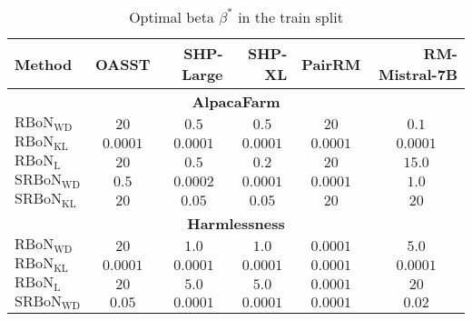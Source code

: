 \begin{table}[tb]
\centering

\caption{Optimal beta $\beta^*$ in the train split}
\small
\begin{tabular}{@{}lrrrrr@{}}
\toprule
\rowcolor[HTML]{EFEFEF} 
 Method & \textbf{OASST} & \textbf{SHP-Large} & \textbf{SHP-XL} & \textbf{PairRM}  & \textbf{RM-Mistral-7B} \\ \midrule

\multicolumn{6}{c}{\textbf{AlpacaFarm}} \\ \midrule
\textbf{$\mathrm{RBoN}_{\mathrm{WD}}$} & \multicolumn{1}{c}{$20$} & \multicolumn{1}{c}{$0.5$} & \multicolumn{1}{c}{$0.5$} & \multicolumn{1}{c}{$20$} & \multicolumn{1}{c}{$0.1$} \\
\textbf{$\mathrm{RBoN}_{\mathrm{KL}}$ } & \multicolumn{1}{c}{$0.0001$} & \multicolumn{1}{c}{$0.0001$} & \multicolumn{1}{c}{$0.0001$} & \multicolumn{1}{c}{$0.0001$} & \multicolumn{1}{c}{$0.0001$} \\
\textbf{$\mathrm{RBoN}_{\mathrm{L}}$} & \multicolumn{1}{c}{$20$} & \multicolumn{1}{c}{$0.5$} & \multicolumn{1}{c}{$0.2$} & \multicolumn{1}{c}{$20$} & \multicolumn{1}{c}{$15.0$} \\
\textbf{$\mathrm{SRBoN}_{\mathrm{WD}}$} & \multicolumn{1}{c}{$0.5$} & \multicolumn{1}{c}{$0.0002$} & \multicolumn{1}{c}{$0.0001$} & \multicolumn{1}{c}{$0.0001$} & \multicolumn{1}{c}{$1.0$} \\
\textbf{$\mathrm{SRBoN}_{\mathrm{KL}}$} & \multicolumn{1}{c}{$20$} & \multicolumn{1}{c}{$0.05$} & \multicolumn{1}{c}{$0.05$} & \multicolumn{1}{c}{$20$} & \multicolumn{1}{c}{$20$} \\
\midrule
\multicolumn{6}{c}{\textbf{Harmlessness}} \\ \midrule
\textbf{$\mathrm{RBoN}_{\mathrm{WD}}$} & \multicolumn{1}{c}{$20$} & \multicolumn{1}{c}{$1.0$} & \multicolumn{1}{c}{$1.0$} & \multicolumn{1}{c}{$0.0001$} & \multicolumn{1}{c}{$5.0$} \\
\textbf{$\mathrm{RBoN}_{\mathrm{KL}}$ } & \multicolumn{1}{c}{$ 0.0001$} & \multicolumn{1}{c}{$ 0.0001$} & \multicolumn{1}{c}{$ 0.0001$} & \multicolumn{1}{c}{$ 0.0001$} & \multicolumn{1}{c}{$ 0.0001$} \\
\textbf{$\mathrm{RBoN}_{\mathrm{L}}$} & \multicolumn{1}{c}{$20$} & \multicolumn{1}{c}{$5.0$} & \multicolumn{1}{c}{$5.0$} & \multicolumn{1}{c}{$0.0001$} & \multicolumn{1}{c}{$20$} \\
\textbf{$\mathrm{SRBoN}_{\mathrm{WD}}$} & \multicolumn{1}{c}{$0.05$} & \multicolumn{1}{c}{$0.0001$} & \multicolumn{1}{c}{ $0.0001$} & \multicolumn{1}{c}{$0.0001$} & \multicolumn{1}{c}{$0.02$} \\

\end{tabular}
\end{table}
